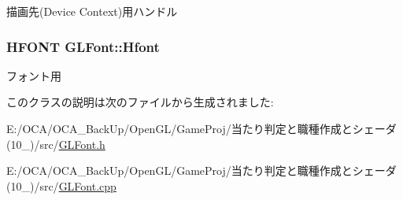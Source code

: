描画先(\-Device Context)用ハンドル 

\hypertarget{class_g_l_font_a177c8719b37d7d9b00437333b744263e}{
\subsubsection[{Hfont}]{\setlength{\rightskip}{0pt plus 5cm}H\-F\-O\-N\-T G\-L\-Font\-::\-Hfont}}\label{class_g_l_font_a177c8719b37d7d9b00437333b744263e}


フォント用 



このクラスの説明は次のファイルから生成されました\-:\begin{DoxyCompactItemize}
\item 
E\-:/\-O\-C\-A/\-O\-C\-A\-\_\-\-Back\-Up/\-Open\-G\-L/\-Game\-Proj/当たり判定と職種作成とシェーダ(10\-\_)/src/\hyperlink{_g_l_font_8h}{G\-L\-Font.\-h}\item 
E\-:/\-O\-C\-A/\-O\-C\-A\-\_\-\-Back\-Up/\-Open\-G\-L/\-Game\-Proj/当たり判定と職種作成とシェーダ(10\-\_)/src/\hyperlink{_g_l_font_8cpp}{G\-L\-Font.\-cpp}\end{DoxyCompactItemize}
